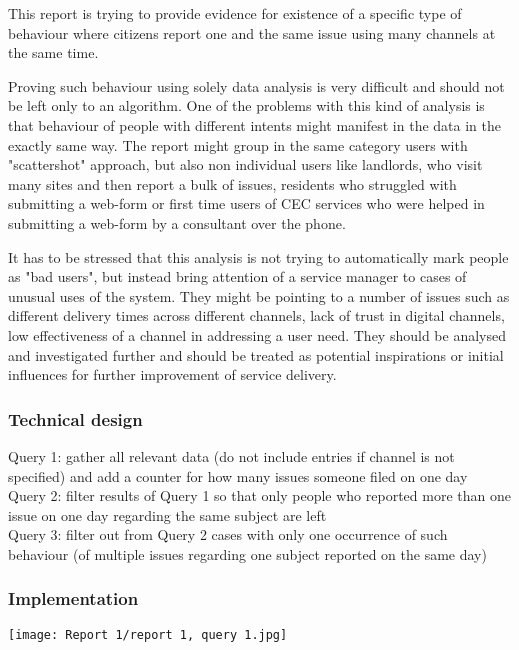 This report is trying to provide evidence for existence of a specific type of behaviour where citizens report one and the same issue using many channels at the same time.

Proving such behaviour using solely data analysis is very difficult and should not be left only to an algorithm. One of the problems with this kind of analysis is that behaviour of people with different intents might manifest in the data in the exactly same way. The report might group in the same category users with "scattershot" approach, but also non individual users like landlords, who visit many sites and then report a bulk of issues, residents who struggled with submitting a web-form or first time users of CEC services who were helped in submitting a web-form by a consultant over the phone.

It has to be stressed that this analysis is not trying to automatically mark people as "bad users", but instead bring attention of a service manager to cases of unusual uses of the system. They might be pointing to a number of issues such as different delivery times across different channels, lack of trust in digital channels, low effectiveness of a channel in addressing a user need. They should be analysed and investigated further and should be treated as potential inspirations or initial influences for further improvement of service delivery.

			\subsubsection{Technical design}
Query 1: gather all relevant data (do not include entries if channel is not specified) and add a counter for how many issues someone filed on one day\\
Query 2: filter results of Query 1 so that only people who reported more than one issue on one day regarding the same subject are left\\
Query 3: filter out from Query 2 cases with only one occurrence of such behaviour (of multiple issues regarding one subject reported on the same day)

			\subsubsection{Implementation}

\begin{center}
  \texttt{[image: Report 1/report 1, query 1.jpg]}
  \label{normal_case}
\end{center}

